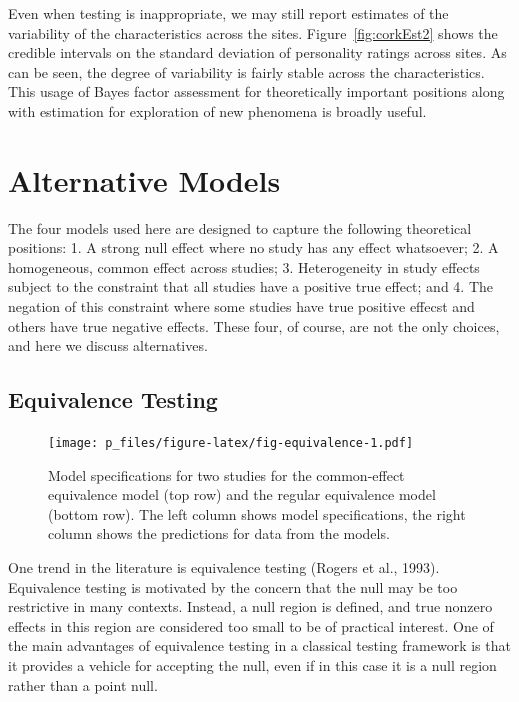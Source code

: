 \documentclass[english,man]{apa6}
\theoremstyle{definition}
\theoremstyle{definition}
\theoremstyle{definition}
\theoremstyle{remark}
\begin{document}
Even when testing is inappropriate, we may still report estimates of the
variability of the characteristics across the sites.
Figure~\ref{fig:corkEst2} shows the credible intervals on the standard
deviation of personality ratings across sites. As can be seen, the
degree of variability is fairly stable across the characteristics. This
usage of Bayes factor assessment for theoretically important positions
along with estimation for exploration of new phenomena is broadly
useful.

\section{Alternative Models}\label{alternative-models}

The four models used here are designed to capture the following
theoretical positions: 1. A strong null effect where no study has any
effect whatsoever; 2. A homogeneous, common effect across studies; 3.
Heterogeneity in study effects subject to the constraint that all
studies have a positive true effect; and 4. The negation of this
constraint where some studies have true positive effecst and others have
true negative effects. These four, of course, are not the only choices,
and here we discuss alternatives.

\subsection{Equivalence Testing}\label{equivalence-testing}

\begin{figure}[htbp]
\centering
\texttt{[image: p\_files/figure-latex/fig-equivalence-1.pdf]}
\caption{\label{fig:fig-equivalence}Model specifications for two studies for
the common-effect equivalence model (top row) and the regular
equivalence model (bottom row). The left column shows model
specifications, the right column shows the predictions for data from the
models.}
\end{figure}

One trend in the literature is equivalence testing (Rogers et al.,
1993). Equivalence testing is motivated by the concern that the null may
be too restrictive in many contexts. Instead, a null region is defined,
and true nonzero effects in this region are considered too small to be
of practical interest. One of the main advantages of equivalence testing
in a classical testing framework is that it provides a vehicle for
accepting the null, even if in this case it is a null region rather than
a point null.
\end{document}
